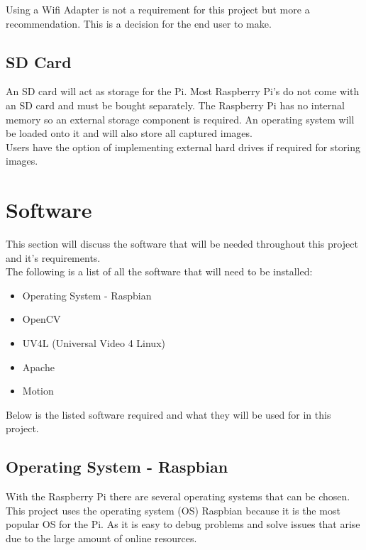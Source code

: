 \documentclass[12pt]{report}
\begin{document}
Using a Wifi Adapter is not a requirement for this project but  more a recommendation. This is a decision for the end user to make.\\

\noindent
\subsection{SD Card}
\label{subsec:sdcard}
An SD card will act as storage for the Pi. Most Raspberry Pi's do not come with an SD card and must be bought separately. The Raspberry Pi has no internal memory so an external storage component is required. An operating system will be loaded onto it and will also store all captured images.\\

Users have the option of implementing external hard drives if required for storing images.\\



\clearpage
\section{Software}	
\label{sec:software}	
This section will discuss the software that will be needed throughout this project and it's requirements.\\

The following is a list of all the software that will need to be installed:\\
\begin{itemize}
  \item Operating System - Raspbian \\
  \item OpenCV\\
  \item UV4L (Universal Video 4 Linux)\\  
  \item Apache\\
  \item Motion\\
\end{itemize}

Below is the listed software required and what they will be used for in this project.

\noindent
\subsection{Operating System - Raspbian}
\label{subsec:raspbian}
With the Raspberry Pi there are several operating systems that can be chosen. This project uses the operating system (OS) Raspbian because it is the most popular OS for the Pi. As it is easy to debug problems and solve issues that arise due to the large amount of online resources.\\
\end{document}
